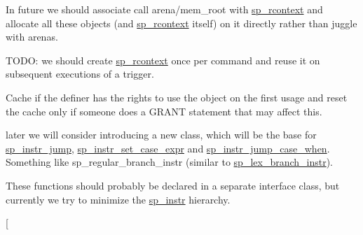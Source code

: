 \begin{DoxyRefList}
In future we should associate call arena/mem\+\_\+root with \mbox{\hyperlink{classsp__rcontext}{sp\+\_\+rcontext}} and allocate all these objects (and \mbox{\hyperlink{classsp__rcontext}{sp\+\_\+rcontext}} itself) on it directly rather than juggle with arenas. 
\item[\label{todo__todo000068}%
\Hypertarget{todo__todo000068}%
Member \mbox{\hyperlink{classsp__head_abd450e9d13f6a39c7b7477ba4b12092f}{sp\+\_\+head\+:\+:execute\+\_\+trigger}} (T\+HD $\ast$thd, const L\+E\+X\+\_\+\+C\+S\+T\+R\+I\+NG \&db\+\_\+name, const L\+E\+X\+\_\+\+C\+S\+T\+R\+I\+NG \&table\+\_\+name, \mbox{\hyperlink{structGRANT__INFO}{G\+R\+A\+N\+T\+\_\+\+I\+N\+FO}} $\ast$grant\+\_\+info)]
\begin{DoxyItemize}
\item T\+O\+DO\+: we should create \mbox{\hyperlink{classsp__rcontext}{sp\+\_\+rcontext}} once per command and reuse it on subsequent executions of a trigger. 
\end{DoxyItemize}
\item[\label{todo__todo000071}%
\Hypertarget{todo__todo000071}%
Member \mbox{\hyperlink{classsp__head_afe7c4aad6b9627d1f38b569b39f66419}{sp\+\_\+head\+:\+:set\+\_\+security\+\_\+ctx}} (T\+HD $\ast$thd, Security\+\_\+context $\ast$$\ast$save\+\_\+ctx)]Cache if the definer has the rights to use the object on the first usage and reset the cache only if someone does a G\+R\+A\+NT statement that \textquotesingle{}may\textquotesingle{} affect this. 
\item[\label{todo__todo000073}%
\Hypertarget{todo__todo000073}%
Class \mbox{\hyperlink{classsp__instr__jump}{sp\+\_\+instr\+\_\+jump}} ]later we will consider introducing a new class, which will be the base for \mbox{\hyperlink{classsp__instr__jump}{sp\+\_\+instr\+\_\+jump}}, \mbox{\hyperlink{classsp__instr__set__case__expr}{sp\+\_\+instr\+\_\+set\+\_\+case\+\_\+expr}} and \mbox{\hyperlink{classsp__instr__jump__case__when}{sp\+\_\+instr\+\_\+jump\+\_\+case\+\_\+when}}. Something like sp\+\_\+regular\+\_\+branch\+\_\+instr (similar to \mbox{\hyperlink{classsp__lex__branch__instr}{sp\+\_\+lex\+\_\+branch\+\_\+instr}}).  
\item[\label{todo__todo000067}%
\Hypertarget{todo__todo000067}%
Member \mbox{\hyperlink{classsp__parser__data_af658fd5aa0ce26b21268b34be0fd2c29}{sp\+\_\+parser\+\_\+data\+:\+:new\+\_\+cont\+\_\+backpatch}} ()]These functions should probably be declared in a separate interface class, but currently we try to minimize the \mbox{\hyperlink{classsp__instr}{sp\+\_\+instr}} hierarchy. 
\item[\label{todo__todo000075}%
$$
\end{DoxyRefList}
